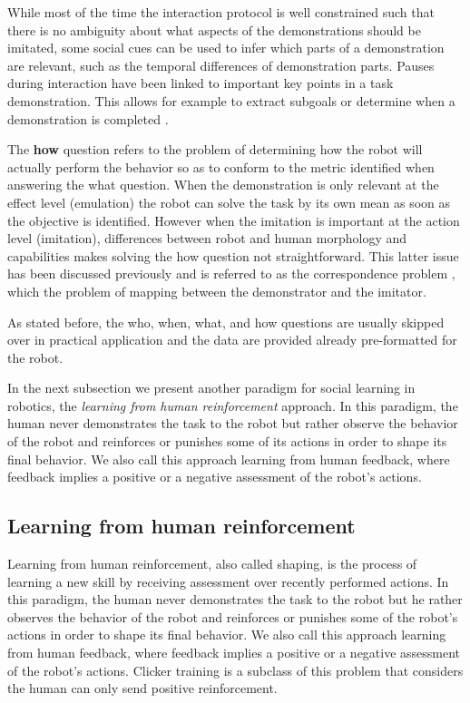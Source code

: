 While most of the time the interaction protocol is well constrained such that there is no ambiguity about what aspects of the demonstrations should be imitated, some social cues can be used to infer which parts of a demonstration are relevant, such as the temporal differences of demonstration parts. Pauses during interaction have been linked to important key points in a task demonstration. This allows for example to extract subgoals or determine when a demonstration is completed \cite{theofilis2013temporal}.

The \textbf{how} question refers to the problem of determining how the robot will actually perform the behavior so as to conform to the metric identified when answering the what question. When the demonstration is only relevant at the effect level (emulation) the robot can solve the task by its own mean as soon as the objective is identified. However when the imitation is important at the action level (imitation), differences between robot and human morphology and capabilities makes solving the how question not straightforward. This latter issue has been discussed previously and is referred to as the correspondence problem \cite{nehaniv2002correspondence}, which the problem of mapping between the demonstrator and the imitator.

\transition

As stated before, the who, when, what, and how questions are usually skipped over in practical application and the data are provided already pre-formatted for the robot.

In the next subsection we present another paradigm for social learning in robotics, the \emph{learning from human reinforcement} approach. In this paradigm, the human never demonstrates the task to the robot but rather observe the behavior of the robot and reinforces or punishes some of its actions in order to shape its final behavior. We also call this approach learning from human feedback, where feedback implies a positive or a negative assessment of the robot's actions.

\subsection{Learning from human reinforcement}

Learning from human reinforcement, also called shaping, is the process of learning a new skill by receiving assessment over recently performed actions. In this paradigm, the human never demonstrates the task to the robot but he rather observes the behavior of the robot and reinforces or punishes some of the robot's actions in order to shape its final behavior. We also call this approach learning from human feedback, where feedback implies a positive or a negative assessment of the robot's actions. Clicker training \cite{kaplan2002robotic} is a subclass of this problem that considers the human can only send positive reinforcement.


